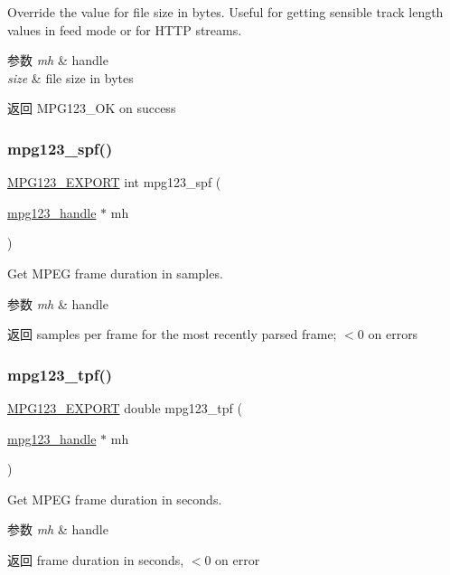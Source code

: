Override the value for file size in bytes. Useful for getting sensible track length values in feed mode or for H\+T\+TP streams. 
\begin{DoxyParams}{参数}
{\em mh} & handle \\
\hline
{\em size} & file size in bytes \\
\hline
\end{DoxyParams}
\begin{DoxyReturn}{返回}
M\+P\+G123\+\_\+\+OK on success 
\end{DoxyReturn}
\mbox{\label{group__mpg123__status_ga361e1b936b6dca126ba46e06e06fcc53}} 
\subsubsection{\texorpdfstring{mpg123\+\_\+spf()}{mpg123\_spf()}}
{\footnotesize\ttfamily \hyperlink{mpg123_8h_a2ba98cfba3f760879df70e755b2a61cc}{M\+P\+G123\+\_\+\+E\+X\+P\+O\+RT} int mpg123\+\_\+spf (\begin{DoxyParamCaption}\item[{\hyperlink{group__mpg123__init_ga6728e2839a395f3a07d4514da659faca}{mpg123\+\_\+handle} $\ast$}]{mh }\end{DoxyParamCaption})}

Get M\+P\+EG frame duration in samples. 
\begin{DoxyParams}{参数}
{\em mh} & handle \\
\hline
\end{DoxyParams}
\begin{DoxyReturn}{返回}
samples per frame for the most recently parsed frame; $<$0 on errors 
\end{DoxyReturn}
\mbox{\label{group__mpg123__status_ga6edf9556db430445dac2434ed5306a12}} 
\subsubsection{\texorpdfstring{mpg123\+\_\+tpf()}{mpg123\_tpf()}}
{\footnotesize\ttfamily \hyperlink{mpg123_8h_a2ba98cfba3f760879df70e755b2a61cc}{M\+P\+G123\+\_\+\+E\+X\+P\+O\+RT} double mpg123\+\_\+tpf (\begin{DoxyParamCaption}\item[{\hyperlink{group__mpg123__init_ga6728e2839a395f3a07d4514da659faca}{mpg123\+\_\+handle} $\ast$}]{mh }\end{DoxyParamCaption})}

Get M\+P\+EG frame duration in seconds. 
\begin{DoxyParams}{参数}
{\em mh} & handle \\
\hline
\end{DoxyParams}
\begin{DoxyReturn}{返回}
frame duration in seconds, $<$0 on error 
\end{DoxyReturn}
